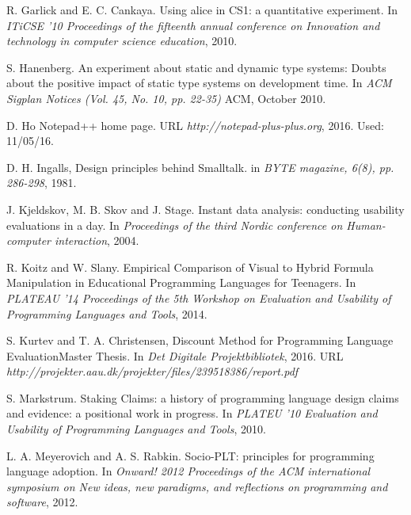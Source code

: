 \documentclass[10pt]{sigplanconf}
\begin{document}
\begin{thebibliography}{}
R. Garlick and E. C. Cankaya. \newblock Using alice in CS1: a quantitative experiment. \newblock In \emph{ITiCSE '10 Proceedings of the fifteenth annual conference on Innovation and technology in computer science education}, 2010.

S. Hanenberg. \newblock An experiment about static and dynamic type systems: Doubts about the positive impact of static type systems on development time. \newblock In \emph{ACM Sigplan Notices (Vol. 45, No. 10, pp. 22-35)} ACM, October 2010.

D. Ho \newblock Notepad++ home page. \newblock URL \emph{http://notepad-plus-plus.org}, 2016. \newblock Used: 11/05/16.

D. H. Ingalls,  \newblock Design principles behind Smalltalk. \newblock in \emph{BYTE magazine, 6(8), pp. 286-298}, 1981. 

J. Kjeldskov, M. B. Skov and J. Stage. \newblock Instant data analysis: conducting usability evaluations in a day. \newblock In \emph{Proceedings of the third Nordic conference on Human-computer interaction}, 2004.

R. Koitz and W. Slany. \newblock Empirical Comparison of Visual to Hybrid Formula Manipulation in Educational Programming Languages for Teenagers. \newblock In \emph{PLATEAU '14 Proceedings of the 5th Workshop on Evaluation and Usability of Programming Languages and Tools}, 2014.

S. Kurtev and T. A. Christensen, \newblock Discount Method for Programming Language Evaluation\newblock Master Thesis. In \emph{Det Digitale Projektbibliotek}, 2016.
\newblock URL \emph{http://projekter.aau.dk/projekter/files/239518386/report.pdf}

S. Markstrum. \newblock Staking Claims: a history of programming language design claims and evidence: a positional work in progress. \newblock In \emph{PLATEU '10 Evaluation and Usability of Programming Languages and Tools}, 2010.

L. A. Meyerovich and A. S. Rabkin. \newblock Socio-PLT: principles for programming language adoption. \newblock In \emph{Onward! 2012 Proceedings of the ACM international symposium on New ideas, new paradigms, and reflections on programming and software}, 2012.


\end{thebibliography}
\end{document}
